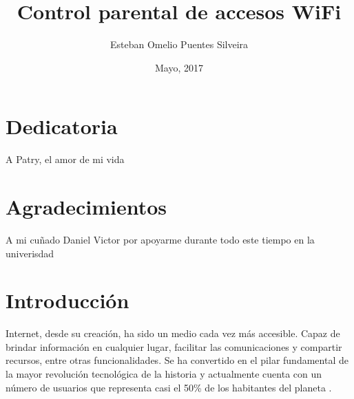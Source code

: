 \documentclass[12pt]{article}
\title{Control parental de accesos WiFi}
\author{Esteban Omelio Puentes Silveira}
\date{Mayo, 2017}
\begin{document}
\maketitle

\clearpage


\section{Dedicatoria}
A Patry, el amor de mi vida

\section{Agradecimientos}
A mi cuñado Daniel Victor por apoyarme durante todo este tiempo en la univerisdad



\renewcommand\contentsname{Índice}
\renewcommand\listfigurename{Índice de figuras}
\renewcommand\listtablename{Índice de tablas}

\setlength{\parskip}{1em}

\tableofcontents
\printindex
\listoffigures
\listoftables

\section{Introducción}\label{sec:int}

Internet, desde su creación, ha sido un medio cada vez más accesible. Capaz de brindar información en cualquier lugar, facilitar las comunicaciones y compartir recursos, entre otras funcionalidades. Se ha convertido en el pilar fundamental de la mayor revolución tecnológica de la historia y actualmente cuenta con un número de usuarios que representa casi el 50\% de los habitantes del planeta \cite{InternetUsage}.
\end{document}
